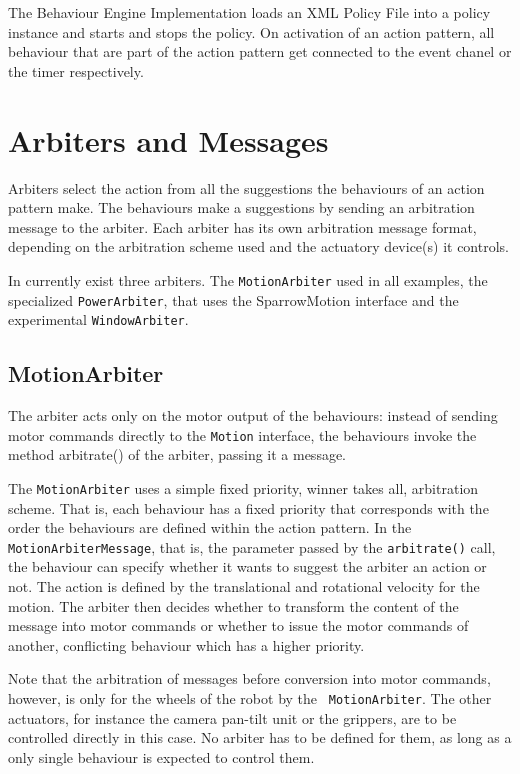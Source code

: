 The Behaviour Engine Implementation loads an XML Policy File into a
policy instance and starts and stops the policy. On activation of an
action pattern, all behaviour that are part of the action pattern get
connected to the event chanel or the timer respectively.

\section{Arbiters and Messages}

Arbiters select the action from all the suggestions the behaviours of
an action pattern make. The behaviours make a suggestions by sending
an arbitration message to the arbiter. Each arbiter has its own
arbitration message format, depending on the arbitration scheme used
and the actuatory device(s) it controls.

In \miro currently exist three arbiters. The {\tt MotionArbiter} used
in all examples, the specialized {\tt PowerArbiter}, that uses the
SparrowMotion interface and the experimental {\tt WindowArbiter}.

\subsection{MotionArbiter}

The arbiter acts only on the motor output of the behaviours:
instead of sending motor commands directly to the {\tt Motion} interface,
the behaviours invoke the method arbitrate() of the arbiter,
passing it a message.

The {\tt MotionArbiter} uses a simple fixed priority, winner
takes all, arbitration scheme. That is, each behaviour has a fixed
priority that corresponds with the order the behaviours are defined
within the action pattern. In the {\tt MotionArbiterMessage}, that is,
the parameter passed by the {\tt arbitrate()} call, the behaviour can
specify whether it wants to suggest the arbiter an action or not. The
action is defined by the translational and rotational velocity for the
motion. The arbiter then decides whether to transform the content of
the message into motor commands or whether to issue the motor commands
of another, conflicting behaviour which has a higher priority.

Note that the arbitration of messages before conversion into motor
commands, however, is only for the wheels of the robot by the {\tt
  MotionArbiter}.  The other actuators, for instance the camera
pan-tilt unit or the grippers, are to be controlled directly in this
case. No arbiter has to be defined for them, as long as a only single
behaviour is expected to control them.

